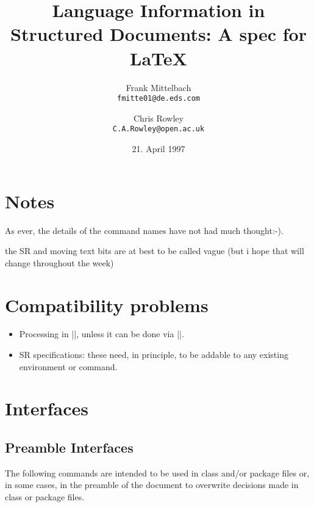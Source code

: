 \documentclass{ltxguide}
\begin{document}
\title{Language Information in
       Structured Documents:
       A spec for \LaTeX{}
}

\author{Frank Mittelbach \\ \texttt{fmitte01@de.eds.com}
   \and Chris Rowley \\ \texttt{C.A.Rowley@open.ac.uk}}

\date{21. April 1997}

\maketitle

\tableofcontents



\section{Notes}

As ever, the details of the command names have not had much
thought:-).

the SR and moving text bits are at best to be called vague (but i hope
that will change throughout the week)



\section{Compatibility problems}

\begin{itemize}

\item Processing in |\document|, unless it can be done via |\AtBeginDocument|.

\item SR specifications: these need, in principle, to be addable to any
  existing environment or command.
\end{itemize}



\section{Interfaces}


\subsection{Preamble Interfaces}

The following commands are intended to be used in class and/or package
files or, in some cases, in the preamble of the document to overwrite
decisions made in class or package files.
\end{document}
